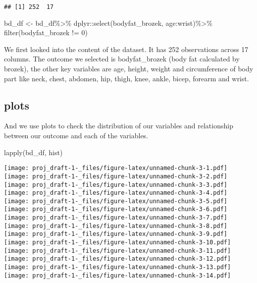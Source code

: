 \documentclass[
]{article}
\newenvironment{Shaded}{\begin{snugshade}}{\end{snugshade}}
\newcommand{\DecValTok}[1]{\textcolor[rgb]{0.00,0.00,0.81}{#1}}
\newcommand{\FunctionTok}[1]{\textcolor[rgb]{0.00,0.00,0.00}{#1}}
\newcommand{\NormalTok}[1]{#1}
\newcommand{\OtherTok}[1]{\textcolor[rgb]{0.56,0.35,0.01}{#1}}
\newcommand{\SpecialCharTok}[1]{\textcolor[rgb]{0.00,0.00,0.00}{#1}}
\begin{document}
\begin{verbatim}
## [1] 252  17
\end{verbatim}

\begin{Shaded}
\begin{Highlighting}[]
\NormalTok{bd\_df }\OtherTok{\textless{}{-}}\NormalTok{ bd\_df}\SpecialCharTok{\%\textgreater{}\%}
\NormalTok{  dplyr}\SpecialCharTok{::}\FunctionTok{select}\NormalTok{(bodyfat\_brozek, age}\SpecialCharTok{:}\NormalTok{wrist)}\SpecialCharTok{\%\textgreater{}\%}
  \FunctionTok{filter}\NormalTok{(bodyfat\_brozek }\SpecialCharTok{!=} \DecValTok{0}\NormalTok{)}
\end{Highlighting}
\end{Shaded}

We first looked into the content of the dataset. It has 252 observations
across 17 columns. The outcome we selected is bodyfat\_brozek (body fat
calculated by brozek), the other key variables are age, height, weight
and circumference of body part like neck, chest, abdomen, hip, thigh,
knee, ankle, bicep, forearm and wrist.

\hypertarget{plots}{%
\subsection{plots}\label{plots}}

And we use plots to check the distribution of our variables and
relationship between our outcome and each of the variables.

\begin{Shaded}
\begin{Highlighting}[]
\FunctionTok{lapply}\NormalTok{(bd\_df, hist)}
\end{Highlighting}
\end{Shaded}

\texttt{[image: proj\_draft-1-\_files/figure-latex/unnamed-chunk-3-1.pdf]}
\texttt{[image: proj\_draft-1-\_files/figure-latex/unnamed-chunk-3-2.pdf]}
\texttt{[image: proj\_draft-1-\_files/figure-latex/unnamed-chunk-3-3.pdf]}
\texttt{[image: proj\_draft-1-\_files/figure-latex/unnamed-chunk-3-4.pdf]}
\texttt{[image: proj\_draft-1-\_files/figure-latex/unnamed-chunk-3-5.pdf]}
\texttt{[image: proj\_draft-1-\_files/figure-latex/unnamed-chunk-3-6.pdf]}
\texttt{[image: proj\_draft-1-\_files/figure-latex/unnamed-chunk-3-7.pdf]}
\texttt{[image: proj\_draft-1-\_files/figure-latex/unnamed-chunk-3-8.pdf]}
\texttt{[image: proj\_draft-1-\_files/figure-latex/unnamed-chunk-3-9.pdf]}
\texttt{[image: proj\_draft-1-\_files/figure-latex/unnamed-chunk-3-10.pdf]}
\texttt{[image: proj\_draft-1-\_files/figure-latex/unnamed-chunk-3-11.pdf]}
\texttt{[image: proj\_draft-1-\_files/figure-latex/unnamed-chunk-3-12.pdf]}
\texttt{[image: proj\_draft-1-\_files/figure-latex/unnamed-chunk-3-13.pdf]}
\texttt{[image: proj\_draft-1-\_files/figure-latex/unnamed-chunk-3-14.pdf]}
\end{document}
